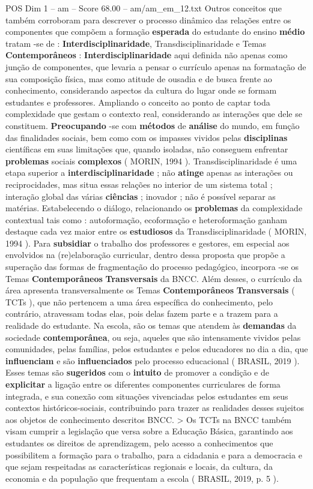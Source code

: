 \begin{textsample}{POS Dim 1 – am – Score 68.00 – am/am\_em\_12.txt}
Outros conceitos que também corroboram para descrever o processo dinâmico das relações entre os componentes que compõem a formação \textbf{esperada} do estudante do ensino \textbf{médio} tratam -se de : \textbf{Interdisciplinaridade}, Transdisciplinaridade e Temas \textbf{Contemporâneos} : \textbf{Interdisciplinaridade} aqui definida não apenas como junção de componentes, que levaria a pensar o currículo apenas na formatação de sua composição física, mas como atitude de ousadia e de busca frente ao conhecimento, considerando aspectos da cultura do lugar onde se formam estudantes e professores.
Ampliando o conceito ao ponto de captar toda complexidade que gestam o contexto real, considerando as interações que dele se constituem. \textbf{Preocupando} -se com \textbf{métodos} de \textbf{análise} do mundo, em função das finalidades sociais, bem como com os impasses vividos pelas \textbf{disciplinas} científicas em suas limitações que, quando isoladas, não conseguem enfrentar \textbf{problemas} sociais \textbf{complexos} ( MORIN, 1994 ).
Transdisciplinaridade é uma etapa superior a \textbf{interdisciplinaridade} ; não \textbf{atinge} apenas as interações ou reciprocidades, mas situa essas relações no interior de um sistema total ; interação global das várias \textbf{ciências} ; inovador ; não é possível separar as matérias.
Estabelecendo o diálogo, relacionando os \textbf{problemas} da complexidade contextual tais como : autoformação, ecoformação e heteroformação ganham destaque cada vez maior entre os \textbf{estudiosos} da Transdisciplinaridade ( MORIN, 1994 ).
Para \textbf{subsidiar} o trabalho dos professores e gestores, em especial aos envolvidos na (re)elaboração curricular, dentro dessa proposta que propõe a superação das formas de fragmentação do processo pedagógico, incorpora -se os Temas \textbf{Contemporâneos} \textbf{Transversais} da BNCC.
Além desses, o currículo da área apresenta transversalmente os Temas \textbf{Contemporâneos} \textbf{Transversais} ( TCTs ), que não pertencem a uma área específica do conhecimento, pelo contrário, atravessam todas elas, pois delas fazem parte e a trazem para a realidade do estudante.
Na escola, são os temas que atendem às \textbf{demandas} da sociedade \textbf{contemporânea}, ou seja, aqueles que são intensamente vividos pelas comunidades, pelas famílias, pelos estudantes e pelos educadores no dia a dia, que \textbf{influenciam} e são \textbf{influenciados} pelo processo educacional ( BRASIL, 2019 ).
Esses temas são \textbf{sugeridos} com o \textbf{intuito} de promover a condição e de \textbf{explicitar} a ligação entre os diferentes componentes curriculares de forma integrada, e sua conexão com situações vivenciadas pelos estudantes em seus contextos históricos-sociais, contribuindo para trazer as realidades desses sujeitos aos objetos de conhecimento descritos BNCC. > Os TCTs na BNCC também visam cumprir a legislação que versa sobre a Educação Básica, garantindo aos estudantes os direitos de aprendizagem, pelo acesso a conhecimentos que possibilitem a formação para o trabalho, para a cidadania e para a democracia e que sejam respeitadas as características regionais e locais, da cultura, da economia e da população que frequentam a escola ( BRASIL, 2019, p. 5 ).

\end{textsample}

